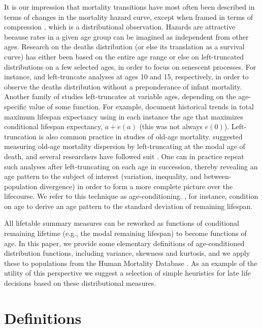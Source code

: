 \documentclass{article}
\begin{document}
It is our impression that mortality transitions have most
often been described in terms of changes in the mortality hazard curve, except
when framed in terms of compression \citep[e.g.,][]{fries1980aging}, which is a
distributional observation.
Hazards are attractive because rates in a given
age group can be imagined as independent from other ages. Research on
the deaths distribution (or else its translation as a survival curve) has either
been based on the entire age range
\citep[e.g.,][]{wilmoth1999rectangularization}
or else on left-truncated distributions on a few selected ages, in order to
focus on senescent processes.
For instance, \citet{edwards2005inequality} and \citet{gillespie2014divergence} left-truncate analyses at
ages 10 and 15, respectively, in order to observe the deaths distribution
without a preponderance of infant mortality. Another family of studies
left-truncates at variable ages, depending on the age-specific value of some
function. For example, \citet{romo2009maximum} document historical trends in
total maximum lifespan expectancy using in each instance the age that maximizes 
conditional lifespan expectancy, $a + e(a)$ (this was not
always $e(0)$). Left-truncation is also common practice in studies of old-age
mortality.
\citet{kannisto2001mode} suggested measuring old-age mortality dispersion by
left-truncating at the modal age of death, and several researchers have followed
suit \citep[e.g.,][among others]{Thatcher_22_17,Ouellette_25_19}. One can in
practice repeat such analyses after left-truncating on each age in
succession, thereby revealing an age pattern to the subject of interest (variation, inequality, and
between-population divergence) in order to form a more complete picture over
the lifecourse. We refer to this technique as age-conditioning.
\citet{engelman2010implications}, for instance, condition on age to derive an
age pattern to the standard deviation of remaining lifespan.

All lifetable
summary measures can be reworked as functions of conditional remaining lifetime
(e.g., the modal remaining lifespan) to become functions of age.
In this paper, we provide some elementary definitions of age-conditioned
distribution functions, including variance, skewness and kurtosis, and we apply
these to populations from the Human Mortality Database .
As an example of the utility of this perspective we suggest a selection of
simple heuristics for late life decisions based on these distributional measures.

\section*{Definitions}
\end{document}
